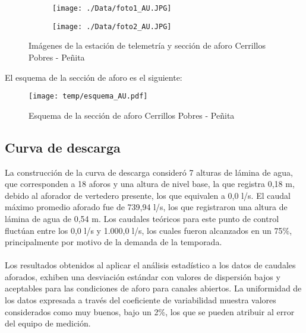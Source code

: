 \documentclass[]{article}
\begin{document}
\begin{figure}[H]
  \centering
\begin{subfigure}{.49\textwidth}
  \texttt{[image: ./Data/foto1\_AU.JPG]}
\end{subfigure}
\hfill
\begin{subfigure}{.49\textwidth}
  \texttt{[image: ./Data/foto2\_AU.JPG]}
\end{subfigure}
\caption{Imágenes de la estación de telemetría y sección de aforo Cerrillos Pobres - Peñita}
\label{fig:fotos_21}
\end{figure}

El esquema de la sección de aforo es el siguiente:

\begin{figure}[H]
  \centering
  \texttt{[image: temp/esquema\_AU.pdf]}
\caption{Esquema de la sección de aforo Cerrillos Pobres - Peñita}
\label{fig:Esquema_AU}
\end{figure}

\subsection{Curva de descarga}\label{curva-de-descarga-20}

La construcción de la curva de descarga consideró 7 alturas de lámina de agua, que corresponden a 18 aforos y una altura de nivel base, la que registra 0,18 m, debido al aforador de vertedero presente, los que equivalen a 0,0 l/s. El caudal máximo promedio aforado fue de 739,94 l/s, los que registraron una altura de lámina de agua de 0,54 m. Los caudales teóricos para este punto de control fluctúan entre los 0,0 l/s y 1.000,0 l/s, los cuales fueron alcanzados en un 75\%, principalmente por motivo de la demanda de la temporada.\\
\\
Los resultados obtenidos al aplicar el análisis estadístico a los datos de caudales aforados, exhiben una desviación estándar con valores de dispersión bajos y aceptables para las condiciones de aforo para canales abiertos. La uniformidad de los datos expresada a través del coeficiente de variabilidad muestra valores considerados como muy buenos, bajo un 2\%, los que se pueden atribuir al error del equipo de medición.
\end{document}
